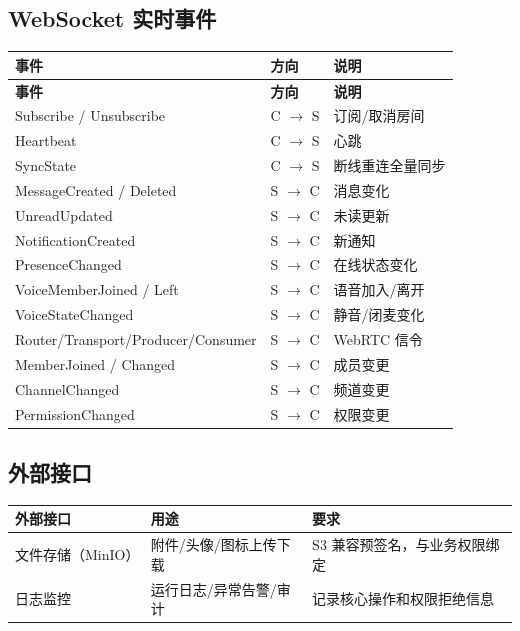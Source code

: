\subsection{WebSocket 实时事件}

\par\medskip
{}
\begin{longtable}{p{4cm}p{2.5cm}p{6cm}}
\toprule
\textbf{事件} & \textbf{方向} & \textbf{说明} \\
\midrule
\endfirsthead
\toprule
\textbf{事件} & \textbf{方向} & \textbf{说明} \\
\midrule
\endhead
Subscribe / Unsubscribe & C $\to$ S & 订阅/取消房间 \\
Heartbeat & C $\to$ S & 心跳 \\
SyncState & C $\to$ S & 断线重连全量同步 \\
MessageCreated / Deleted & S $\to$ C & 消息变化 \\
UnreadUpdated & S $\to$ C & 未读更新 \\
NotificationCreated & S $\to$ C & 新通知 \\
PresenceChanged & S $\to$ C & 在线状态变化 \\
VoiceMemberJoined / Left & S $\to$ C & 语音加入/离开 \\
VoiceStateChanged & S $\to$ C & 静音/闭麦变化 \\
Router/Transport/Producer/Consumer & S $\to$ C & WebRTC 信令 \\
MemberJoined / Changed & S $\to$ C & 成员变更 \\
ChannelChanged & S $\to$ C & 频道变更 \\
PermissionChanged & S $\to$ C & 权限变更 \\
\bottomrule
\end{longtable}
\medskip

\subsection{外部接口}
\noindent\begin{tabularx}{\textwidth}{L{3cm}L{3.2cm}Y}
  \toprule
  外部接口 & 用途 & 要求 \\
  \midrule
  文件存储（MinIO） & 附件/头像/图标上传下载 & S3 兼容预签名，与业务权限绑定 \\
  日志监控 & 运行日志/异常告警/审计 & 记录核心操作和权限拒绝信息 \\
  \bottomrule
\end{tabularx}